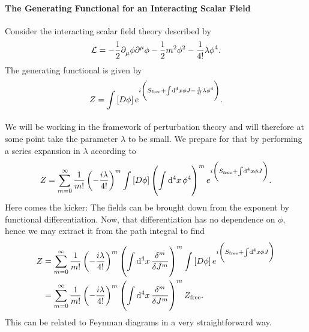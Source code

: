 \paragraph{The Generating Functional for an Interacting Scalar Field}
Consider the interacting scalar field theory described by
\begin{align*}
	\mathcal{L} = -\frac{1}{2}\partial^{}_{\mu}\phi\partial^{\mu}_{}\phi - \frac{1}{2}m^{2}\phi^{2} - \frac{1}{4!}\lambda\phi^{4}.
\end{align*}
The generating functional is given by
\begin{align*}
	Z = \int\limits_{}\left[D\phi\right]e^{i\left(S_{\text{free}} + \int\limits_{}^{}\dd[4]{x}\phi J - \frac{1}{4!}\lambda\phi^{4}\right)}.
\end{align*}
We will be working in the framework of perturbation theory and will therefore at some point take the parameter $\lambda$ to be small. We prepare for that by performing a series expansion in $\lambda$ according to
\begin{align*}
	Z = \sum\limits_{m = 0}^{\infty}\frac{1}{m!}\left(-\frac{i\lambda}{4!}\right)^{m}\int\limits_{}\left[D\phi\right]\left(\int\limits_{}^{}\dd[4]{x}\phi^{4}\right)^{m}e^{i\left(S_{\text{free}} + \int\limits_{}^{}\dd[4]{x}\phi J\right)}.
\end{align*}
Here comes the kicker: The fields can be brought down from the exponent by functional differentiation. Now, that differentiation has no dependence on $\phi$, hence we may extract it from the path integral to find
\begin{align*}
	Z &= \sum\limits_{m = 0}^{\infty}\frac{1}{m!}\left(-\frac{i\lambda}{4!}\right)^{m}\left(\integ[4]{}{}{x}{\fdv[m]{J}\right)^{m}}\pinte{}{\phi}e^{i\left(S_{\text{free}} + \integ[4]{}{}{x}{\phi J}\right)} \\
	  &= \sum\limits_{m = 0}^{\infty}\frac{1}{m!}\left(-\frac{i\lambda}{4!}\right)^{m}\left(\integ[4]{}{}{x}{\fdv[m]{J}\right)^{m}}Z_{\text{free}}.
\end{align*}
This can be related to Feynman diagrams in a very straightforward way.